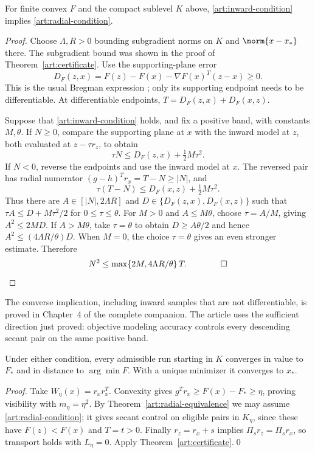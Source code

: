 \begin{theorem}\label{art:radial-equivalence}
For finite convex $F$ and the compact sublevel $K$ above,
\eqref{art:inward-condition} implies \eqref{art:radial-condition}.
\end{theorem}
\begin{proof}
Choose $\Lambda,R>0$ bounding subgradient norms on $K$ and $\norm{x-x_*}$ there.
The subgradient bound was shown in the proof of Theorem~\ref{art:certificate}.
Use the supporting-plane error
\[
 D_F(z,x)=F(z)-F(x)-\nabla F(x)^T(z-x)\ge0.
\]
This is the usual Bregman expression \cite{BB}; only its supporting endpoint
needs to be differentiable. At differentiable endpoints,
$T=D_F(z,x)+D_F(x,z)$.

Suppose that \eqref{art:inward-condition} holds, and fix a positive band,
with constants $M,\theta$. If $N\ge0$, compare the supporting plane at $x$
with the inward model at $z$, both evaluated at $z-\tau r_z$, to obtain
\[
 \tau N\le D_F(z,x)+\tfrac12M\tau^2.
\]
If $N<0$, reverse the endpoints and use the inward model at $x$. The reversed
pair has radial numerator $(g-h)^Tr_x=T-N\ge|N|$, and
\[
 \tau(T-N)\le D_F(x,z)+\tfrac12M\tau^2.
\]
Thus there are $A\in[|N|,2\Lambda R]$ and
$D\in\{D_F(z,x),D_F(x,z)\}$ such that
$\tau A\le D+M\tau^2/2$ for $0\le\tau\le\theta$.
For $M>0$ and $A\le M\theta$, choose $\tau=A/M$, giving $A^2\le2MD$.
If $A>M\theta$, take $\tau=\theta$ to obtain
$D\ge A\theta/2$ and hence $A^2\le(4\Lambda R/\theta)D$.
When $M=0$, the choice $\tau=\theta$ gives an even stronger estimate.
Therefore
\begin{equation}\label{art:inward-to-radial}
 N^2\le \max\{2M,4\Lambda R/\theta\}\,T.\qquad\qed
\end{equation}
\end{proof}

The converse implication, including inward samples that are not
differentiable, is proved in Chapter~4 of the complete companion. The article
uses the sufficient direction just proved: objective modeling accuracy
controls every descending secant pair on the same positive band.

\begin{corollary}\label{art:radial-convergence}
Under either condition, every admissible run starting in $K$
converges in value to $F_*$ and in distance to $\arg\min F$. With a unique
minimizer it converges to $x_*$.
\end{corollary}
\begin{proof}
Take $W_\eta(x)=r_xr_x^T$. Convexity gives
$g^Tr_x\ge F(x)-F_*\ge\eta$, proving visibility with $m_\eta=\eta^2$.
By Theorem~\ref{art:radial-equivalence} we may assume \eqref{art:radial-condition};
it gives secant control on eligible pairs in $K_\eta$, since these have
$F(z)<F(x)$ and $T=t>0$.
Finally $r_z=r_x+s$ implies $\Pi_sr_z=\Pi_sr_x$, so transport holds with
$L_\eta=0$. Apply Theorem~\ref{art:certificate}.\qed
\end{proof}

